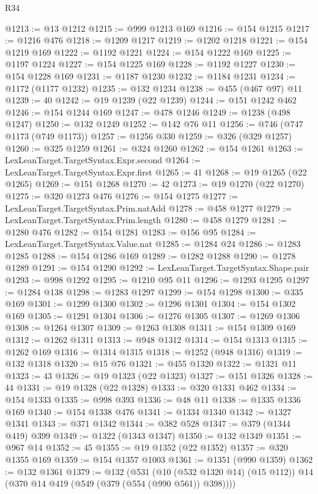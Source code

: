 \begin{lexlean}{R34}
\begin{coremodule}
@1213 := @13 @1212
@1215 := @999 @1213 @169
@1216 := @154 @1215
@1217 := @1216 @476
@1218 := @1209 @1217
@1219 := @1202 @1218
@1221 := @154 @1219 @169
@1222 := @1192 @1221
@1224 := @154 @1222 @169
@1225 := @1197 @1224
@1227 := @154 @1225 @169
@1228 := @1192 @1227
@1230 := @154 @1228 @169
@1231 := @1187 @1230
@1232 := @1184 @1231
@1234 := @1172 (@1177 @1232)
@1235 := @132 @1234
@1238 := @455 (@467 @97) @11
@1239 := 40
@1242 := @19 @1239 (@22 @1239)
@1244 := @151 @1242 @462
@1246 := @154 @1244 @169
@1247 := @478 @1246
@1249 := @1238 (@498 @1247)
@1250 := @132 @1249
@1252 := @142 @76 @11
@1256 := @746 (@747 @1173 (@749 @1173))
@1257 := @1256 @330
@1259 := @326 (@329 @1257)
@1260 := @325 @1259
@1261 := @324 @1260
@1262 := @154 @1261
@1263 := LexLeanTarget.TargetSyntax.Expr.second
@1264 := LexLeanTarget.TargetSyntax.Expr.first
@1265 := 41
@1268 := @19 @1265 (@22 @1265)
@1269 := @151 @1268
@1270 := 42
@1273 := @19 @1270 (@22 @1270)
@1275 := @320 @1273 @476
@1276 := @154 @1275
@1277 := LexLeanTarget.TargetSyntax.Prim.natAdd
@1278 := @458 @1277
@1279 := LexLeanTarget.TargetSyntax.Prim.length
@1280 := @458 @1279
@1281 := @1280 @476
@1282 := @154 @1281
@1283 := @156 @95
@1284 := LexLeanTarget.TargetSyntax.Value.nat
@1285 := @1284 @24
@1286 := @1283 @1285
@1288 := @154 @1286 @169
@1289 := @1282 @1288
@1290 := @1278 @1289
@1291 := @154 @1290
@1292 := LexLeanTarget.TargetSyntax.Shape.pair
@1293 := @998 @1292
@1295 := @1210 @95 @11
@1296 := @1293 @1295
@1297 := @1284 @138
@1298 := @1283 @1297
@1299 := @154 @1298
@1300 := @335 @169
@1301 := @1299 @1300
@1302 := @1296 @1301
@1304 := @154 @1302 @169
@1305 := @1291 @1304
@1306 := @1276 @1305
@1307 := @1269 @1306
@1308 := @1264 @1307
@1309 := @1263 @1308
@1311 := @154 @1309 @169
@1312 := @1262 @1311
@1313 := @948 @1312
@1314 := @154 @1313
@1315 := @1262 @169
@1316 := @1314 @1315
@1318 := @1252 (@948 @1316)
@1319 := @132 @1318
@1320 := @15 @76
@1321 := @455 @1320
@1322 := @1321 @11
@1323 := 43
@1326 := @19 @1323 (@22 @1323)
@1327 := @151 @1326
@1328 := 44
@1331 := @19 @1328 (@22 @1328)
@1333 := @320 @1331 @462
@1334 := @154 @1333
@1335 := @998 @393
@1336 := @48 @11
@1338 := @1335 @1336 @169
@1340 := @154 @1338 @476
@1341 := @1334 @1340
@1342 := @1327 @1341
@1343 := @371 @1342
@1344 := @382 @528
@1347 := @379 (@1344 @419) @399
@1349 := @1322 (@1343 @1347)
@1350 := @132 @1349
@1351 := @967 @14
@1352 := 45
@1355 := @19 @1352 (@22 @1352)
@1357 := @320 @1355 @169
@1359 := @154 @1357 @1003
@1361 := @1351 (@990 @1359)
@1362 := @132 @1361
@1379 := @132
    (@531
      (@10 (@532 @1320 @14) (@15 @112))
      @14
      (@370 @14 @419 (@549 (@379 (@554 (@990 @561)) @398))))

\end{coremodule}
\end{lexlean}
